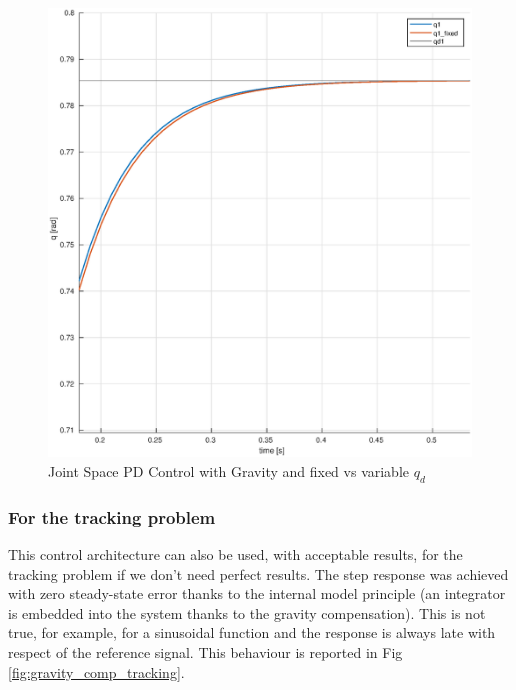 \documentclass[a4paper,12pt]{article}
\begin{document}
\begin{figure}[H]
    \begin{center}
        \includegraphics[scale=0.4]{images/gravity_comp_fixed.eps}
    \end{center}
    \caption{Joint Space PD Control with Gravity and fixed vs variable $q_d$}
    \label{fig:gravity_comp_fixed}
\end{figure}

\subsubsection{For the tracking problem}

This control architecture can also be used, with acceptable results, for the tracking problem if we don't need perfect results. The step response was achieved with zero steady-state error thanks to the internal model principle (an integrator is embedded into the system thanks to the gravity compensation). This is not true, for example, for a sinusoidal function and the response is always late with respect of the reference signal. This behaviour is reported in Fig \ref{fig:gravity_comp_tracking}.
\end{document}
